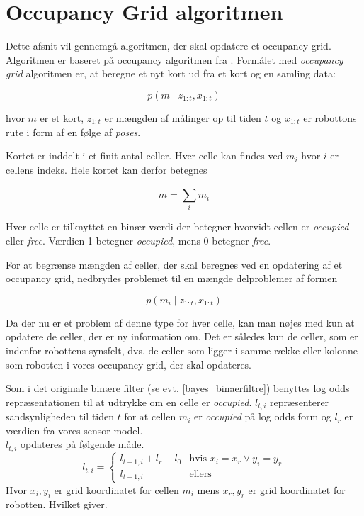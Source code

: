 \section{Occupancy Grid algoritmen}
Dette afsnit vil gennemgå algoritmen, der skal opdatere et occupancy grid.
Algoritmen er baseret på occupancy algoritmen fra \cite[p. 286]{probabilisticRobotics}.
Formålet med \textit{occupancy grid} algoritmen er, at beregne	et nyt kort ud fra et kort og en samling data:

\begin{equation}
p(m \mid z_{1:t}, x_{1:t})
\end{equation}

hvor $m$ er et kort, $ z_{1:t} $ er mængden af målinger op til tiden $t$ og $ x_{1:t} $ er robottons rute i form af en følge af \textit{poses}.

Kortet er inddelt i et finit antal celler.
Hver celle kan findes ved $ m_i $ hvor $i$ er cellens indeks. 
Hele kortet kan derfor betegnes

\begin{equation}
m = \sum_{i}^{} m_i 
\end{equation}

Hver celle er tilknyttet en binær værdi der betegner hvorvidt cellen er \textit{occupied} eller \textit{free}.
Værdien 1 betegner \textit{occupied}, mens 0 betegner \textit{free}.

For at begrænse mængden af celler, der skal beregnes ved en opdatering af et occupancy grid, nedbrydes problemet til en mængde delproblemer af formen

\begin{equation}
p(m_i \mid z_{1:t}, x_{1:t})
\end{equation} 

Da der nu er et problem af denne type for hver celle, kan man nøjes med kun at opdatere de celler, der er ny information om. 
Det er således kun de celler, som er indenfor robottens synsfelt, dvs. de celler som ligger i samme række eller kolonne som robotten i vores occupancy grid, der skal opdateres.


Som i det originale binære filter (se evt. \cref{bayes_binaerfiltre}) benyttes log odds repræsentationen til at udtrykke om en celle er \textit{occupied}.
$l_{t,i}$ repræsenterer sandsynligheden til tiden $t$ for at cellen $m_i$ er \textit{occupied} på log odds form og $l_r$ er værdien fra vores sensor model. \\

$l_{t,i}$ opdateres på følgende måde.
\begin{equation}
	l_{t,i} = \begin{cases}
		l_{t-1,i} + l_r - l_0 &\text{hvis } x_i = x_r \vee y_i = y_r \\
		l_{t-1,i} &\text{ellers}
	\end{cases}
\end{equation}
Hvor $x_i, y_i$ er grid koordinatet for cellen $m_i$ mens $x_r, y_r$ er grid koordinatet for robotten. Hvilket giver.

